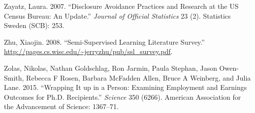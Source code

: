 \documentclass[]{krantz}
\begin{document}
\hypertarget{ref-zayatz2007disclosure}{}
Zayatz, Laura. 2007. ``Disclosure Avoidance Practices and Research at
the US Census Bureau: An Update.'' \emph{Journal of Official Statistics}
23 (2). Statistics Sweden (SCB): 253.

\hypertarget{ref-zhu2005semi}{}
Zhu, Xiaojin. 2008. ``Semi-Supervised Learning Literature Survey.''
\url{http://pages.cs.wisc.edu/~jerryzhu/pub/ssl_survey.pdf}.

\hypertarget{ref-zolas2015wrapping}{}
Zolas, Nikolas, Nathan Goldschlag, Ron Jarmin, Paula Stephan, Jason
Owen-Smith, Rebecca F Rosen, Barbara McFadden Allen, Bruce A Weinberg,
and Julia Lane. 2015. ``Wrapping It up in a Person: Examining Employment
and Earnings Outcomes for Ph.D. Recipients.'' \emph{Science} 350 (6266).
American Association for the Advancement of Science: 1367--71.
\end{document}
